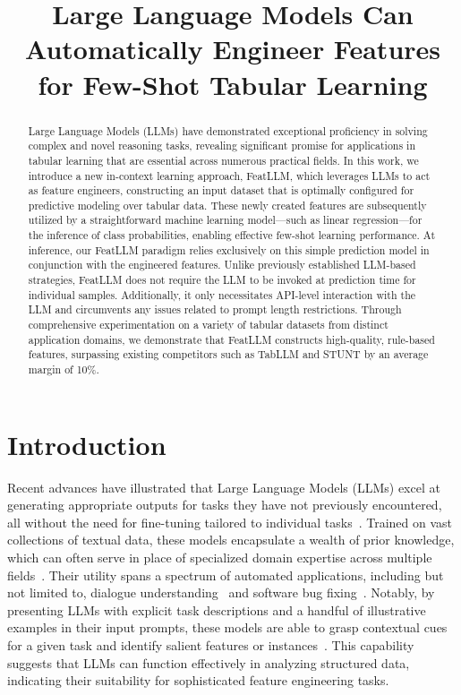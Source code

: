 \title{Large Language Models Can Automatically Engineer Features for Few-Shot Tabular Learning}

\begin{abstract}
Large Language Models (LLMs) have demonstrated exceptional proficiency in solving complex and novel reasoning tasks, revealing significant promise for applications in tabular learning that are essential across numerous practical fields. In this work, we introduce a new in-context learning approach, \textsf{FeatLLM}, which leverages LLMs to act as feature engineers, constructing an input dataset that is optimally configured for predictive modeling over tabular data. These newly created features are subsequently utilized by a straightforward machine learning model—such as linear regression—for the inference of class probabilities, enabling effective few-shot learning performance. At inference, our \textsf{FeatLLM} paradigm relies exclusively on this simple prediction model in conjunction with the engineered features. Unlike previously established LLM-based strategies, \textsf{FeatLLM} does not require the LLM to be invoked at prediction time for individual samples. Additionally, it only necessitates API-level interaction with the LLM and circumvents any issues related to prompt length restrictions. Through comprehensive experimentation on a variety of tabular datasets from distinct application domains, we demonstrate that \textsf{FeatLLM} constructs high-quality, rule-based features, surpassing existing competitors such as TabLLM and STUNT by an average margin of 10\%.
\end{abstract}

\section{Introduction}
Recent advances have illustrated that Large Language Models (LLMs) excel at generating appropriate outputs for tasks they have not previously encountered, all without the need for fine-tuning tailored to individual tasks~\cite{creswell2022selection,imani2023mathprompter,taylor2022galactica}. Trained on vast collections of textual data, these models encapsulate a wealth of prior knowledge, which can often serve in place of specialized domain expertise across multiple fields~\cite{Genomes2021,singhal2023large,wilcox2003role}. Their utility spans a spectrum of automated applications, including but not limited to, dialogue understanding~\cite{finch2023leveraging} and software bug fixing~\cite{fan2023automated}. Notably, by presenting LLMs with explicit task descriptions and a handful of illustrative examples in their input prompts, these models are able to grasp contextual cues for a given task and identify salient features or instances~\cite{brown2020language,zhao2023survey}. This capability suggests that LLMs can function effectively in analyzing structured data, indicating their suitability for sophisticated feature engineering tasks.

